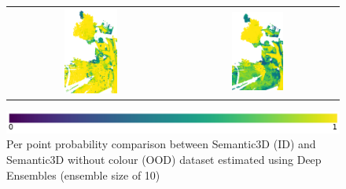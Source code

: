 \begin{figure}[h!]
\begin{tabular}{cc}
            \includegraphics[width=0.33\textwidth, height=0.18\textheight]{images/ood_imgs/de_sem3d/de_prob_10_3.pdf}&
            \includegraphics[width=0.33\textwidth, height=0.18\textheight]{images/sem3d_of/de_prob_sem3d_of_3.pdf}\\
        \end{tabular}
        \includegraphics[scale=0.45]{images/prob_legend.pdf}
        \caption{Per point probability comparison between Semantic3D (ID) and Semantic3D without colour (OOD) dataset estimated using Deep Ensembles (ensemble size of 10)}
        \label{fig:de_probmap_vis_sem3d_OF}
    \end{figure}

